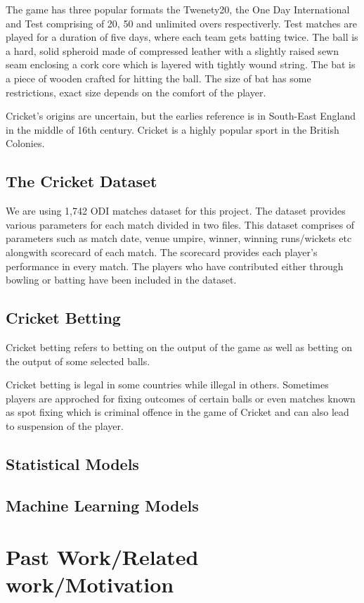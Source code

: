 \documentclass[fleqn,10pt]{wlscirep}
\begin{document}
The game has three popular formats the Twenety20, the One Day International and Test comprising of 20, 50 and unlimited overs respectiverly. Test matches are played for a
duration of five days, where each team gets batting twice.
The ball is a hard, solid spheroid made of compressed leather with a slightly raised sewn seam enclosing a cork core which is layered with tightly wound string. The bat is a
piece of wooden crafted for hitting the ball. The size of bat has some restrictions, exact size depends on the comfort of the player.

Cricket's origins are uncertain, but the earlies reference is in South-East England in the middle of 16th century. Cricket is a highly popular sport 
in the British Colonies.

\subsection{The Cricket Dataset}

We are using 1,742 ODI matches dataset for this project. The dataset provides various parameters for each match divided in two files.
This dataset comprises of parameters such as match date, venue umpire, winner, winning runs/wickets etc alongwith scorecard of each match.
The scorecard provides each player's performance in every match. The players who have contributed either through bowling or batting have been included in the dataset.

\subsection{Cricket Betting}
Cricket betting refers to betting on the output of the game as well as betting on the output of some selected balls.

Cricket betting is legal in some countries while illegal in others. Sometimes players are approched for fixing outcomes of certain balls 
or even matches known as spot fixing which is criminal offence in the game of Cricket and can also lead to suspension of the player.
\subsection{Statistical Models}
\subsection{Machine Learning Models}
\section{Past Work/Related work/Motivation}
\end{document}
